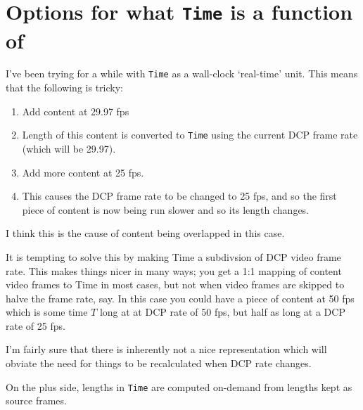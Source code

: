 \documentclass{article}
\begin{document}
\section{Options for what \texttt{Time} is a function of}

I've been trying for a while with \texttt{Time} as a wall-clock
`real-time' unit.  This means that the following is tricky:

\begin{enumerate}
\item Add content at 29.97 fps
\item Length of this content is converted to \texttt{Time} using the
  current DCP frame rate (which will be 29.97).
\item Add more content at 25 fps.
\item This causes the DCP frame rate to be changed to 25 fps, and so
  the first piece of content is now being run slower and so its length
  changes.
\end{enumerate}

I think this is the cause of content being overlapped in this case.

It is tempting to solve this by making Time a subdivsion of DCP video
frame rate.  This makes things nicer in many ways; you get a 1:1
mapping of content video frames to Time in most cases, but not when
video frames are skipped to halve the frame rate, say.  In this case
you could have a piece of content at 50 fps which is some time $T$
long at at DCP rate of 50 fps, but half as long at a DCP rate of 25 fps.

I'm fairly sure that there is inherently not a nice representation which
will obviate the need for things to be recalculated when DCP rate changes.

On the plus side, lengths in \texttt{Time} are computed on-demand from
lengths kept as source frames.
\end{document}
